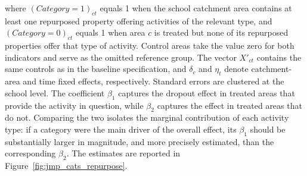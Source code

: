 \documentclass[12pt]{article}
\theoremstyle{plain}
\theoremstyle{plain}
\theoremstyle{plain}
\theoremstyle{definition}
\theoremstyle{plain}
\theoremstyle{definition}
\theoremstyle{plain}
\theoremstyle{remark}
\theoremstyle{definition}
\theoremstyle{definition}
\theoremstyle{plain}
\begin{document}
 where $(Category =1)_{ct}$ equals 1 when the school catchment area contains at least one repurposed property offering activities of the relevant type, and $(Category = 0)_{ct}$ equals 1 when area $c$ is treated but none of its repurposed properties offer that type of activity. Control areas take the value zero for both indicators and serve as the omitted reference group. The vector $X'_{ct}$ contains the same controls as in the baseline specification, and $\delta_c$ and $\eta_t$ denote catchment-area and time fixed effects, respectively. Standard errors are clustered at the school level. The coefficient $\beta_1$ captures the dropout effect in treated areas that provide the activity in question, while $\beta_2$ captures the effect in treated areas that do not. Comparing the two isolates the marginal contribution of each activity type: if a category were the main driver of the overall effect, its $\beta_1$ should be substantially larger in magnitude, and more precisely estimated, than the corresponding $\beta_2$. The estimates are reported in Figure~\ref{fig:jmp_cats_repurpose}. \\
\clearpage


\clearpage


 
\end{document}
